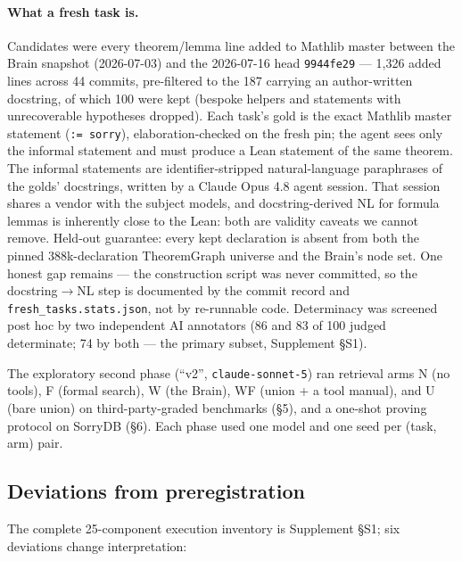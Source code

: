 \documentclass[10pt]{article}
\newcommand{\code}[1]{\texttt{#1}}
\newcommand{\Ssec}[1]{Supplement \S #1}
\begin{document}
\paragraph{What a fresh task is.} Candidates were every theorem/lemma
line added to Mathlib master between the Brain snapshot (2026-07-03) and
the 2026-07-16 head \code{9944fe29} --- 1,326 added lines across 44
commits, pre-filtered to the 187 carrying an author-written docstring,
of which 100 were kept (bespoke helpers and statements with
unrecoverable hypotheses dropped). Each task's gold is the exact Mathlib
master statement (\code{:= sorry}), elaboration-checked on the fresh
pin; the agent sees only the informal statement and must produce a Lean
statement of the same theorem. The informal statements are
identifier-stripped natural-language paraphrases of the golds'
docstrings, written by a Claude Opus 4.8 agent session. That session
shares a vendor with the subject models, and docstring-derived NL for
formula lemmas is inherently close to the Lean: both are validity
caveats we cannot remove. Held-out guarantee: every kept declaration is
absent from both the pinned 388k-declaration TheoremGraph universe and
the Brain's node set. One honest gap remains --- the construction script
was never committed, so the docstring$\to$NL step is documented by the
commit record and \code{fresh\_tasks.stats.json}, not by re-runnable
code. Determinacy was screened post hoc by two independent AI annotators
(86 and 83 of 100 judged determinate; 74 by both --- the primary subset,
\Ssec{S1}).

The exploratory second phase (``v2'', \code{claude-sonnet-5}) ran
retrieval arms N (no tools), F (formal search), W (the Brain), WF (union
+ a tool manual), and U (bare union) on third-party-graded benchmarks
(\S 5), and a one-shot proving protocol on SorryDB (\S 6). Each phase
used one model and one seed per (task, arm) pair.

\subsection{Deviations from preregistration}\label{sec:deviations}

The complete 25-component execution inventory is \Ssec{S1}; six
deviations change interpretation:
\end{document}
